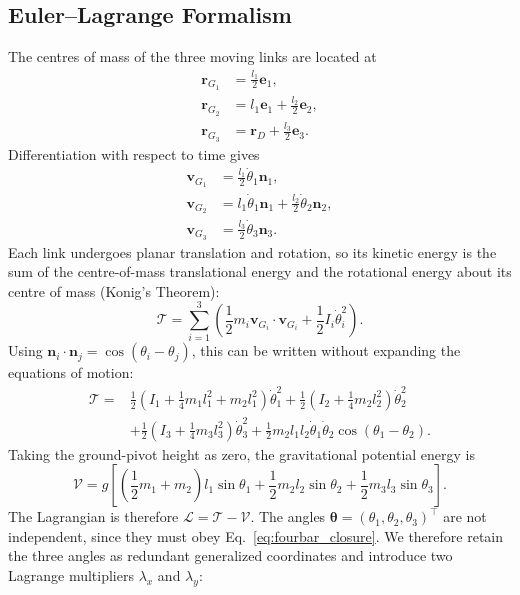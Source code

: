 \subsection{Euler--Lagrange Formalism}
\label{subsec:fourbar_lagrange}

The centres of mass of the three moving links are located at
\begin{align}
    \mathbf r_{G_1}&=\frac{l_1}{2}\mathbf e_1,\\
    \mathbf r_{G_2}&=l_1\mathbf e_1+\frac{l_2}{2}\mathbf e_2,\\
    \mathbf r_{G_3}&=\mathbf r_D+\frac{l_3}{2}\mathbf e_3.
\end{align}
Differentiation with respect to time gives
\begin{align}
    \mathbf v_{G_1}&=\frac{l_1}{2}\dot\theta_1\mathbf n_1,\\
    \mathbf v_{G_2}&=l_1\dot\theta_1\mathbf n_1
                  +\frac{l_2}{2}\dot\theta_2\mathbf n_2,\\
    \mathbf v_{G_3}&=\frac{l_3}{2}\dot\theta_3\mathbf n_3.
\end{align}
Each link undergoes planar translation and rotation, so its kinetic energy is the sum of the centre-of-mass translational energy and the rotational energy about its centre of mass (Konig's Theorem):
\begin{equation}
    \mathcal T=\sum_{i=1}^3\left(
      \frac12m_i\mathbf v_{G_i}\!\cdot\!\mathbf v_{G_i}
      +\frac12I_i\dot\theta_i^2\right).
\end{equation}
Using $\mathbf n_i\cdot\mathbf n_j=\cos(\theta_i-\theta_j)$, this can be written without expanding the equations of motion:
\begin{align}
    \mathcal T={}&
    \frac12\left(I_1+\frac14m_1l_1^2+m_2l_1^2\right)\dot\theta_1^2
    +\frac12\left(I_2+\frac14m_2l_2^2\right)\dot\theta_2^2\nonumber\\
    &+\frac12\left(I_3+\frac14m_3l_3^2\right)\dot\theta_3^2
    +\frac12m_2l_1l_2\dot\theta_1\dot\theta_2
      \cos(\theta_1-\theta_2).
\end{align}
Taking the ground-pivot height as zero, the gravitational potential energy is
\begin{equation}
    \mathcal V=g\left[
      \left(\frac12m_1+m_2\right)l_1\sin\theta_1
      +\frac12m_2l_2\sin\theta_2
      +\frac12m_3l_3\sin\theta_3\right].
\end{equation}
The Lagrangian is therefore $\mathcal L=\mathcal T-\mathcal V$. The angles $\boldsymbol\theta=(\theta_1,\theta_2,\theta_3)^\top$ are not independent, since they must obey Eq.~\eqref{eq:fourbar_closure}. We therefore retain the three angles as redundant generalized coordinates and introduce two Lagrange multipliers $\lambda_x$ and $\lambda_y$:
